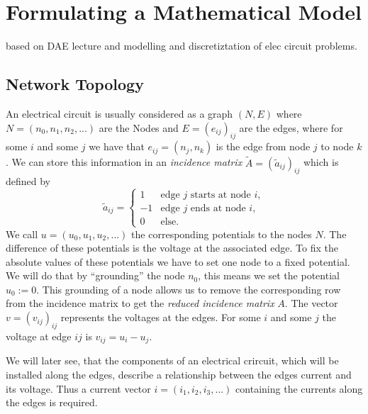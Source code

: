\chapter{Formulating a Mathematical Model}
based on DAE lecture and modelling and discretiztation of elec circuit problems.
\section{Network Topology}
An electrical circuit is usually considered as a graph $(N,E)$ where $N = (n_0, n_1, n_2, ...)$ are the Nodes and $E = (e_{ij})_{ij}$ are the edges, where for some $i$ and some $j$ we have that $e_{ij} = (n_j, n_k)$ is the edge from node $j$ to node $k$. %
We can store this information in an \emph{incidence matrix} $\tilde{A} = (\tilde{a}_{ij})_{ij}$ which is defined by
\begin{displaymath}
	\tilde{a}_{ij} = 
	\begin{cases}
		1 &   \text{edge $j$ starts at node $i$},\\
		-1 &  \text{edge $j$  ends at node $i$},\\
		0 & \text{else}.				
	\end{cases}
\end{displaymath}
We call $u = (u_0, u_1, u_2, ...)$ the corresponding potentials to the nodes $N$. The difference of these potentials is the voltage at the associated edge. To fix the absolute values of these potentials we have to set one node to a fixed potential. We will do that by ``grounding'' the node $n_0$, this means we set the potential $u_0 := 0$. This grounding of a node allows us to remove the corresponding row from the incidence matrix to get the \emph{reduced incidence matrix} $A$. The vector $v = (v_{ij})_{ij}$ represents the voltages at the edges. For some $i$ and some $j$ the voltage at edge $ij$ is $v_{ij} = u_i - u_j$.

We will later see, that the components of an electrical crircuit, which will be installed along the edges, describe a relationship between the edges current and its voltage. Thus a current vector $i = (i_1, i_2, i_3, ...)$ containing the currents along the edges is required.

